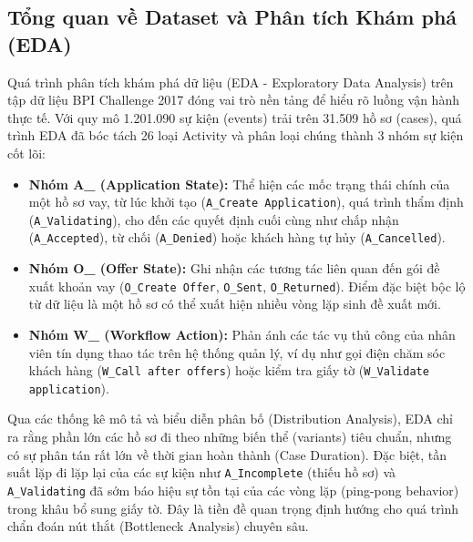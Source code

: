 \documentclass[a4paper,12pt]{article}
\begin{document}
\subsection{Tổng quan về Dataset và Phân tích Khám phá (EDA)}
Quá trình phân tích khám phá dữ liệu (EDA - Exploratory Data Analysis) trên tập dữ liệu BPI Challenge 2017 đóng vai trò nền tảng để hiểu rõ luồng vận hành thực tế. Với quy mô 1.201.090 sự kiện (events) trải trên 31.509 hồ sơ (cases), quá trình EDA đã bóc tách 26 loại Activity và phân loại chúng thành 3 nhóm sự kiện cốt lõi:
\begin{itemize}
    \item \textbf{Nhóm A\_ (Application State):} Thể hiện các mốc trạng thái chính của một hồ sơ vay, từ lúc khởi tạo (\texttt{A\_Create Application}), quá trình thẩm định (\texttt{A\_Validating}), cho đến các quyết định cuối cùng như chấp nhận (\texttt{A\_Accepted}), từ chối (\texttt{A\_Denied}) hoặc khách hàng tự hủy (\texttt{A\_Cancelled}).
    \item \textbf{Nhóm O\_ (Offer State):} Ghi nhận các tương tác liên quan đến gói đề xuất khoản vay (\texttt{O\_Create Offer}, \texttt{O\_Sent}, \texttt{O\_Returned}). Điểm đặc biệt bộc lộ từ dữ liệu là một hồ sơ có thể xuất hiện nhiều vòng lặp sinh đề xuất mới.
    \item \textbf{Nhóm W\_ (Workflow Action):} Phản ánh các tác vụ thủ công của nhân viên tín dụng thao tác trên hệ thống quản lý, ví dụ như gọi điện chăm sóc khách hàng (\texttt{W\_Call after offers}) hoặc kiểm tra giấy tờ (\texttt{W\_Validate application}).
\end{itemize}

Qua các thống kê mô tả và biểu diễn phân bố (Distribution Analysis), EDA chỉ ra rằng phần lớn các hồ sơ đi theo những biến thể (variants) tiêu chuẩn, nhưng có sự phân tán rất lớn về thời gian hoàn thành (Case Duration). Đặc biệt, tần suất lặp đi lặp lại của các sự kiện như \texttt{A\_Incomplete} (thiếu hồ sơ) và \texttt{A\_Validating} đã sớm báo hiệu sự tồn tại của các vòng lặp (ping-pong behavior) trong khâu bổ sung giấy tờ. Đây là tiền đề quan trọng định hướng cho quá trình chẩn đoán nút thắt (Bottleneck Analysis) chuyên sâu.
\end{document}
